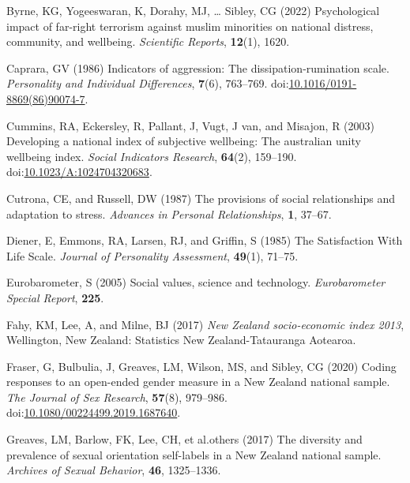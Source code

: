 \documentclass[
  single column]{article}
\newlength{\cslhangindent}
\newenvironment{CSLReferences}[2] %
 {\begin{list}{}{%
  \setlength{\itemindent}{0pt}
  \setlength{\leftmargin}{0pt}
  \setlength{\parsep}{0pt}
  \ifodd #1
   \setlength{\leftmargin}{\cslhangindent}
   \setlength{\itemindent}{-1\cslhangindent}
  \fi
  \setlength{\itemsep}{#2\baselineskip}}}
 {\end{list}}
\begin{document}
\begin{CSLReferences}{1}{0}
Byrne, KG, Yogeeswaran, K, Dorahy, MJ, \ldots{} Sibley, CG (2022)
Psychological impact of far-right terrorism against muslim minorities on
national distress, community, and wellbeing. \emph{Scientific Reports},
\textbf{12}(1), 1620.

Caprara, GV (1986) Indicators of aggression: The dissipation-rumination
scale. \emph{Personality and Individual Differences}, \textbf{7}(6),
763--769.
doi:\href{https://doi.org/10.1016/0191-8869(86)90074-7}{10.1016/0191-8869(86)90074-7}.

Cummins, RA, Eckersley, R, Pallant, J, Vugt, J van, and Misajon, R
(2003) Developing a national index of subjective wellbeing: The
australian unity wellbeing index. \emph{Social Indicators Research},
\textbf{64}(2), 159--190.
doi:\href{https://doi.org/10.1023/A:1024704320683}{10.1023/A:1024704320683}.

Cutrona, CE, and Russell, DW (1987) The provisions of social
relationships and adaptation to stress. \emph{Advances in Personal
Relationships}, \textbf{1}, 37--67.

Diener, E, Emmons, RA, Larsen, RJ, and Griffin, S (1985) The
Satisfaction With Life Scale. \emph{Journal of Personality Assessment},
\textbf{49}(1), 71--75.

Eurobarometer, S (2005) Social values, science and technology.
\emph{Eurobarometer Special Report}, \textbf{225}.

Fahy, KM, Lee, A, and Milne, BJ (2017) \emph{{N}ew {Z}ealand
socio-economic index 2013}, Wellington, New Zealand: Statistics New
Zealand-Tatauranga Aotearoa.

Fraser, G, Bulbulia, J, Greaves, LM, Wilson, MS, and Sibley, CG (2020)
Coding responses to an open-ended gender measure in a {N}ew {Z}ealand
national sample. \emph{The Journal of Sex Research}, \textbf{57}(8),
979--986.
doi:\href{https://doi.org/10.1080/00224499.2019.1687640}{10.1080/00224499.2019.1687640}.

Greaves, LM, Barlow, FK, Lee, CH, et al.others (2017) The diversity and
prevalence of sexual orientation self-labels in a {N}ew {Z}ealand
national sample. \emph{Archives of Sexual Behavior}, \textbf{46},
1325--1336.


\end{CSLReferences}
\end{document}
